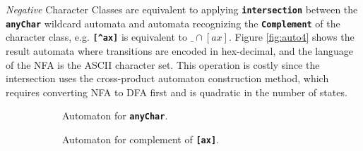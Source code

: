 \textit{Negative} Character Classes are equivalent to applying \texttt{\textbf{intersection}} between the \texttt{\textbf{anyChar}} wildcard automata and automata recognizing the \texttt{\textbf{Complement}} of the character class, e.g. \texttt{\textbf{[\textasciicircum ax]}} is equivalent to \texttt{\textbf{$\_ \cap [ax]$}}. Figure \ref{fig:auto4} shows the result automata where transitions are encoded in hex-decimal, and the language of the NFA is the ASCII character set. This operation is costly since the intersection uses the cross-product automaton construction method, which requires converting NFA to DFA first and is quadratic in the number of states.

\begin{figure}[htbp]

\begin{subfigure}[b]{0.5\textwidth}
\centering
{}
\caption{Automaton for \texttt{\textbf{anyChar}}.}
\label{fig:auto41}
\end{subfigure}
\hfill
\begin{subfigure}[b]{0.5\textwidth}
\centering
{}
\caption{Automaton for complement of \texttt{\textbf{[ax]}}.}
\label{fig:auto42}
\end{subfigure}\\


\begin{subfigure}[b]{\textwidth}
\centering
{}
\end{subfigure}
\end{figure}
